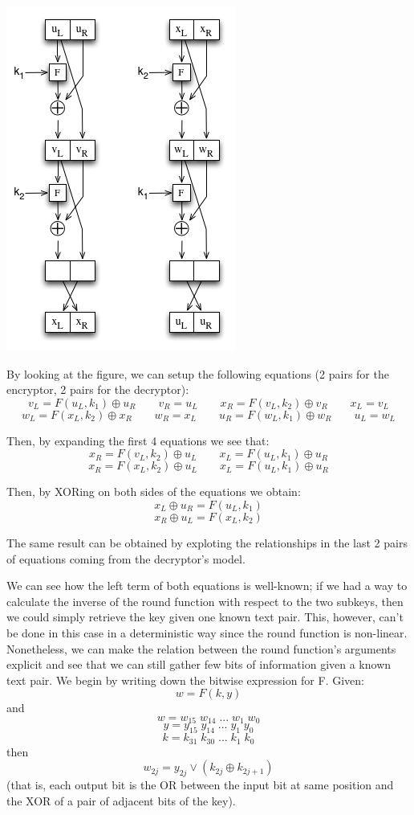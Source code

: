 \documentclass[a4paper,12pt,titlepage]{article}
\begin{document}
\includegraphics{2_rounds_feistel.jpg}

By looking at the figure, we can setup the following equations (2 pairs for the
encryptor, 2 pairs for the decryptor):
\[v_L = F(u_L, k_1) \oplus u_R \qquad v_R = u_L \qquad x_R = F(v_L, k_2) \oplus v_R \qquad x_L = v_L\]
\[w_L = F(x_L, k_2) \oplus x_R \qquad w_R = x_L \qquad u_R = F(w_L, k_1) \oplus w_R \qquad u_L = w_L\]

Then, by expanding the first 4 equations we see that:
\[ x_R = F(v_L, k_2) \oplus u_L \qquad x_L = F(u_L, k_1) \oplus u_R \]
\[ x_R = F(x_L, k_2) \oplus u_L \qquad x_L = F(u_L, k_1) \oplus u_R \]

Then, by XORing on both sides of the equations we obtain:
\[x_L \oplus u_R = F(u_L, k_1)\]
\[x_R \oplus u_L = F(x_L, k_2)\]

The same result can be obtained by exploting the relationships in the last 2
pairs of equations coming from the decryptor's model.

We can see how the left term of both equations is well-known; if we had a way
to calculate the inverse of the round function with respect to the two subkeys,
then we could simply retrieve the key given one known text pair. This, however,
can't be done in this case in a deterministic way since the round function is
non-linear. Nonetheless, we can make the relation between the round function's
arguments explicit and see that we can still gather few bits of information
given a known text pair. We begin by writing down the bitwise expression for F.
Given:
\[w = F(k, y)\]
and
\[w = w_{15} \; w_{14} \; ... \; w_1 \; w_0\]
\[y = y_{15} \; y_{14} \; ... \; y_1 \; y_0\]
\[k = k_{31} \; k_{30} \; ... \; k_1 \; k_0\]
then
\[w_{2j} = y_{2j} \vee (k_{2j} \oplus k_{2j+1})\]
(that is, each output bit is the OR between the input bit at same position and
the XOR of a pair of adjacent bits of the key).
\end{document}
